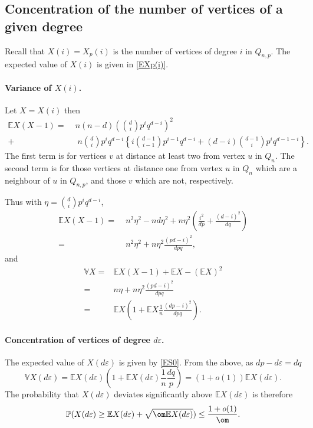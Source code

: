 \documentclass[12pt]{article}
\def\e{\varepsilon} \def\f{\phi} \def\F{{\Phi}} \def\vp{\varphi} \def\g{\gamma}
\newcommand{\ooi}{(1+o(1))}
\newcommand{\brac}[1]{\left(#1\right)}
\def\E{\mathbb{E}}
\def\Var{\mathbb{V}}
\def\Pr{\mathbb{P}}
\begin{document}
\subsection{Concentration of the number of vertices of a given degree}\label{Conc-Var}
Recall that $X(i)=X_p(i)$ is the number of vertices of degree $i$ in $Q_{n,p}$. The expected value of $X(i)$ is given in \eqref{EXp(i)}.

\paragraph{Variance of $X(i)$.}
Let $X=X(i)$ then
\begin{align*}
\E X(X-1)=& \; n(n-d) \brac{{d \choose i}p^iq^{d-i}}^2 \\
+&\;\;n {d \choose i}p^i q^{d-i}
\left\{ i {d-1 \choose i-1} p^{i-1} q^{d-i} + (d-i) {d-1 \choose i}p^i q^{d-1-i}\right\}.
\end{align*}
The first term is for vertices $v$ at distance at least two  from vertex $u$ in $Q_n$.
The second term is for those vertices at distance one from vertex $u$ in $Q_n$ which are a neighbour of $u$ in $Q_{n,p}$, and those $v$ which are not, respectively.

Thus with $\eta={d \choose i}p^i q^{d-i}$,
\begin{align*}
\E X(X-1)=& \;n^2 \eta^2 -nd \eta^2 +n \eta^2 \brac{\frac{i^2}{dp} + \frac{(d-i)^2}{dq}}\\
=&\; n^2\eta^2 +n \eta^2 \frac{(pd-i)^2}{dpq},
\end{align*}
and
\begin{align*}
\Var X=& \E X(X-1)+\E X-(\E X)^2\\
=& n\eta+ n\eta^2 \frac{(pd-i)^2}{dpq}\\
=& \E X\brac{1+ \E X \frac 1n \frac{(dp-i)^2}{dpq}}.
\end{align*}

\paragraph{Concentration of vertices of degree $d\e$.}
The expected value of $X(d\e)$ is given by \eqref{ES0}.
From the above, as $dp-d\e=dq$
\[
 \Var X(d\e)= \E X(d\e)\brac{1+ \E X(d\e) \frac 1n \frac{dq}{p}}=\ooi \E X(d\e).
\]
The probability that $X(d\e)$ deviates significantly above $\E X(d\e)$ is  therefore
\[
\Pr(X(d\e) \ge \E X(d\e)+ \sqrt {\om \E X(d\e )} )\le  \frac{1+o(1)}{\om}.
\]
\end{document}
